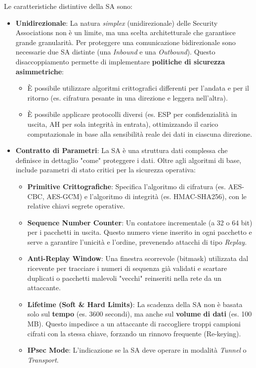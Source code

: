 \documentclass[a4paper, 11pt]{article}
\begin{document}
Le caratteristiche distintive della SA sono:
\begin{itemize}
    \item \textbf{Unidirezionale}:
    La natura \textit{simplex} (unidirezionale) delle Security Associations non è un limite, ma una scelta architetturale che garantisce grande granularità.
    Per proteggere una comunicazione bidirezionale sono necessarie due SA distinte (una \textit{Inbound} e una \textit{Outbound}).
    Questo disaccoppiamento permette di implementare \textbf{politiche di sicurezza asimmetriche}:
    \begin{itemize}
        \item È possibile utilizzare algoritmi crittografici differenti per l'andata e per il ritorno (es. cifratura pesante in una direzione e leggera nell'altra).
        \item È possibile applicare protocolli diversi (es. ESP per confidenzialità in uscita, AH per sola integrità in entrata), ottimizzando il carico computazionale in base alla sensibilità reale dei dati in ciascuna direzione.
    \end{itemize}

    \item \textbf{Contratto di Parametri}:
    La SA è una struttura dati complessa che definisce in dettaglio "come" proteggere i dati. Oltre agli algoritmi di base, include parametri di stato critici per la sicurezza operativa:
    \begin{itemize}
        \item \textbf{Primitive Crittografiche}: Specifica l'algoritmo di cifratura (es. AES-CBC, AES-GCM) e l'algoritmo di integrità (es. HMAC-SHA256), con le relative chiavi segrete operative.
        \item \textbf{Sequence Number Counter}: Un contatore incrementale (a 32 o 64 bit) per i pacchetti in uscita. Questo numero viene inserito in ogni pacchetto e serve a garantire l'unicità e l'ordine, prevenendo attacchi di tipo \textit{Replay}.
        \item \textbf{Anti-Replay Window}: Una finestra scorrevole (bitmask) utilizzata dal ricevente per tracciare i numeri di sequenza già validati e scartare duplicati o pacchetti malevoli "vecchi" reinseriti nella rete da un attaccante.
        \item \textbf{Lifetime (Soft \& Hard Limits)}: La scadenza della SA non è basata solo sul \textbf{tempo} (es. 3600 secondi), ma anche sul \textbf{volume di dati} (es. 100 MB). Questo impedisce a un attaccante di raccogliere troppi campioni cifrati con la stessa chiave, forzando un rinnovo frequente (Re-keying).
        \item \textbf{IPsec Mode}: L'indicazione se la SA deve operare in modalità \textit{Tunnel} o \textit{Transport}.
    \end{itemize}


\end{itemize}
\end{document}
